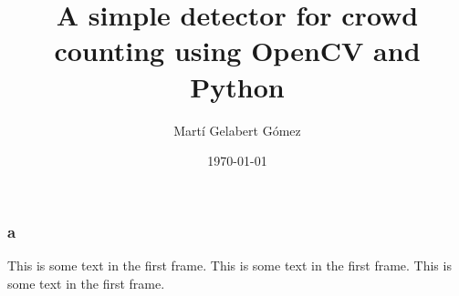 \documentclass{beamer}
\title{A simple detector for crowd counting using OpenCV and Python}
\author{Martí Gelabert Gómez}
\institute{University of the Balearic Islands}
\date{\today}
\begin{document}
\frame{\titlepage}

\begin{frame}
\frametitle{a}
This is some text in the first frame. This is some text in the first frame. This is some text in the first frame.
\end{frame}
\end{document}
